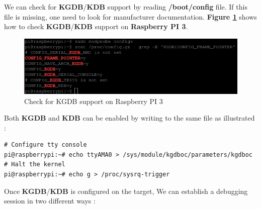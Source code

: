 \begin{center}
\begin{mdframed}[
        linecolor=red,linewidth=2pt,%
        frametitlerule=true,%
        apptotikzsetting={\tikzset{mdfframetitlebackground/.append style={%
            shade,left color=white, right color=blue!20}}}, 
        frametitlerulecolor=blue,
        frametitlerulewidth=1pt, innertopmargin=\topskip,
        frametitle={Check kernel KGDB/KDB support and enable them},
        outerlinewidth=1.25pt
    ]
			
	 We can check for \textbf{KGDB}/\textbf{KDB} support by reading \textbf{/boot/config} file. If this file is missing, one need to look for manufacturer documentation. \textbf{Figure \ref{Check for KGDB support on Raspberry PI 3}} shows how to check \textbf{KGDB}/\textbf{KDB} support on \textbf{Raspberry PI 3}.
\begin{figure}[H]
		\centering
        \includegraphics[scale=0.35]{img/solution/kgdb-support-raspberry-pi-3.png}
        \caption{Check for KGDB support on Raspberry PI 3}
        \label{Check for KGDB support on Raspberry PI 3}
\end{figure}

 

Both \textbf{KGDB} and \textbf{KDB} can be enabled by writing to the same file as illustrated :
\begin{lstlisting}[style=BashInputStyle]
# Configure tty console
pi@raspberrypi:~# echo ttyAMA0 > /sys/module/kgdboc/parameters/kgdboc
# Halt the kernel
pi@raspberrypi:~# echo g > /proc/sysrq-trigger
\end{lstlisting}		
			
			
\end{mdframed}
\end{center} 







Once \textbf{KGDB}/\textbf{KDB} is configured on the target, We can establish a debugging session in two different ways :

